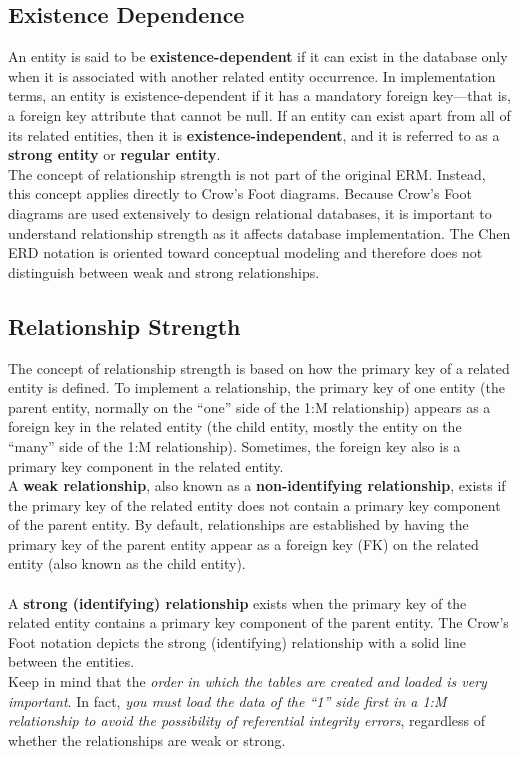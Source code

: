 \documentclass[a4paper, 12pt, titlepage]{report}
\begin{document}
{\subsection{Existence Dependence}
An entity is said to be \textbf{existence-dependent} if it can exist in the database only when it is associated with another related entity occurrence. In implementation terms, an entity is existence-dependent if it has a mandatory foreign key—that is, a foreign key attribute that cannot be null. If an entity can exist apart from all of its related entities, then it is \textbf{existence-independent}, and it is referred to as a \textbf{strong entity} or \textbf{regular entity}. \\The concept of relationship strength is not part of the original ERM. Instead, this concept applies directly to Crow’s Foot diagrams. Because Crow’s Foot diagrams are used extensively to design relational databases, it is important to understand relationship strength as it affects database implementation. The Chen ERD notation is oriented toward conceptual modeling and therefore does not distinguish between weak and strong relationships.

\subsection{Relationship Strength}
The concept of relationship strength is based on how the primary key of a related entity is defined. To implement a relationship, the primary key of one entity (the parent entity,
normally on the “one” side of the 1:M relationship) appears as a foreign key in the related entity (the child entity, mostly the entity on the “many” side of the 1:M relationship). Sometimes, the foreign key also is a primary key component in the related entity.\\
A \textbf{weak relationship}, also known as a \textbf{non-identifying relationship}, exists if the primary key of the related entity does not contain a primary key component of the parent entity. By default, relationships are established by having the primary key of the parent entity appear as a foreign key (FK) on the related entity (also known as the child entity).\\ \\
A \textbf{strong (identifying) relationship} exists when the primary key of the related entity contains a primary key component of the parent entity. The Crow’s Foot notation depicts the strong (identifying) relationship with a solid line between the entities.\\
Keep in mind that the \emph{order in which the tables are created and loaded is very important}. In fact, \emph{you must load the data of the “1” side first in a 1:M relationship to avoid the possibility of referential integrity errors}, regardless of whether the relationships are weak or strong.

}
\end{document}
